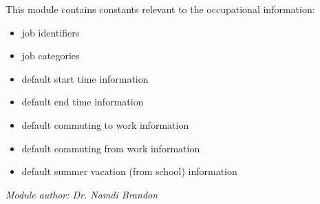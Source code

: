 \documentclass[letterpaper,10pt,english]{sphinxmanual}
\begin{document}
This module contains constants relevant to the occupational information:
\begin{itemize}
\item {} 
job identifiers

\item {} 
job categories

\item {} 
default start time information

\item {} 
default end time information

\item {} 
default commuting to work information

\item {} 
default commuting from work information

\item {} 
default summer vacation (from school) information

\end{itemize}

\emph{Module author: Dr. Namdi Brandon}
\end{document}
